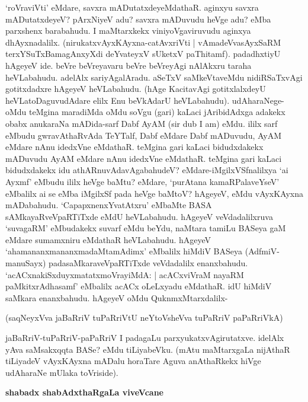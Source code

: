 \noindent
`roVraviVti' eMdare, savxra mADutatxdeyeMdathaR. aginxyu savxra 
mADutatxdeyeV? pArxNiyeV adu? savxra mADuvudu heVge adu? eMba 
parxshenx barabahudu. I maMtarxkekx viniyoVgaviruvudu aginxya 
dhAyxnadalilx. (nirukatxvAyxKAyxna-catAvxriVti | vAmadeVvasAyxSaRM\label{112} 
terxYSuTxBamagAnxyXdi deYvateyxV sUketxV paThitamf). padadhxtiyU hAgeyeV ide. beVre beVreyavaru beVre beVreyAgi nAlAkxru taraha heVLabahudu. adelAlx sariyAgalAradu. aSeTxV saMkeVtaveMdu nidiRSaTxvAgi gotitxdadxre hAgeyeV heVLabahudu. (hAge KacitavAgi gotitxlalxdeyU heVLatoDaguvudAdare elilx Enu beVkAdarU heVLabahudu). udAharaNege-oMdu teMgina maradiMda oMdu soVgu (gari) kaLaci jAribidAdxga adakekx obabx anukaraNa mADida-sarf Dabf AyAM {(\rm sir dub I am)} eMdu. ililx sarf eMbudu gwravAthaRvAda TeYTalf, Dabf eMdare Dabf mADuvudu, AyAM eMdare nAnu idedxVne eMdathaR. teMgina gari kaLaci bidudxdakekx mADuvudu AyAM eMdare nAnu idedxVne eMdathaR. teMgina gari kaLaci bidudxdakekx idu athARnuvAdavAgabahudeV? eMdare-iMgilxVSfnalilxya `ai Ayxmf' \hbox{eMbudu} ililx heVge baMtu? eMdare, `purAtana kamaRPalaveYseV' eMbalilx ai se eMba iMgilxSf pada heVge baMtoV? hAgeyeV, eMdu vAyxKAyxna mADabahudu. `CapapxnenxYvatAtxru' eMbaMte BASA sAMkayaRveVpaRTiTxde eMdU heVLabahudu. hAgeyeV veVdadalilxruva `suvagaRM' eMbudakekx suvarf eMdu beYdu, naMtara tamiLu BASeya gaM eMdare sumamxniru eMdathaR heVLabahudu. hAgeyeV `ahamananxmananxmadaMtamAdimx' eMbalilx hiMdiV BASeya (AdfmiV-manuSayx) padasaMkaraveVpaRTiTxde veVdadalilx enanxbahudu. `acACxnakiSxduyxmatatxmoVrayiMdA: | acACxviVraM nayaRM paMkitxrAdhasamf' eMbalilx acACx oLeLxyadu eMdathaR. idU hiMdiV saMkara enanxbahudu. hAgeyeV oMdu QuknmxMtarxdalilx-

(saqNeyxVva jaBaRriV tuPaRriVtU neYtoVsheVva tuPaRriV paPaRriVkA)\label{113}

jaBaRriV-tuPaRriV-paPaRriV I padagaLu parxyukatxvAgirutatxve. idelAlx yAva saMsakxqqta BASe? eMdu tiLiyabeVku. (mAtu maMtarxgaLa nijAthaR tiLiyadeV vAyxKAyxna mADalu horaTare Aguva anAthaRkekx hiVge udAharaNe mUlaka toVriside).

{\bigskip
\noindent
{\large\bf shabadx shabAdxthaRgaLa viveVcane}}\label{page113}
\medskip

